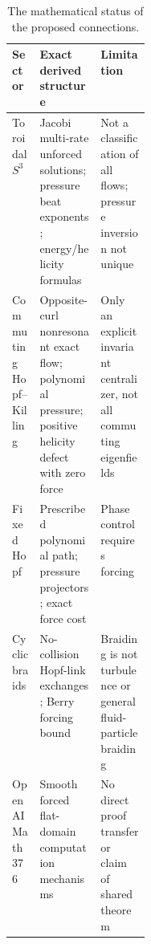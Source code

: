 \documentclass[10pt,letterpaper]{article}
\theoremstyle{remark}
\begin{document}
\clearpage
\begin{table}[htbp]
\centering\small
\caption{The mathematical status of the proposed connections.}
\begin{tabularx}{\linewidth}{@{}p{0.20\linewidth}XX@{}}
\toprule
Sector & Exact derived structure & Limitation\\\midrule
Toroidal $S^3$ & Jacobi multi-rate unforced solutions; pressure beat exponents; energy/helicity formulas & Not a classification of all flows; pressure inversion not unique\\
Commuting Hopf--Killing & Opposite-curl nonresonant exact flow; polynomial pressure; positive helicity defect with zero force & Only an explicit invariant centralizer, not all commuting eigenfields\\
Fixed Hopf & Prescribed polynomial path; pressure projectors; exact force cost & Phase control requires forcing\\
Cyclic braids & No-collision Hopf-link exchanges; Berry forcing bound & Braiding is not turbulence or general fluid-particle braiding\\
OpenAI Math 376 & Smooth forced flat-domain computation mechanisms & No direct proof transfer or claim of shared theorem\\
\bottomrule
\end{tabularx}
\end{table}
\end{document}
